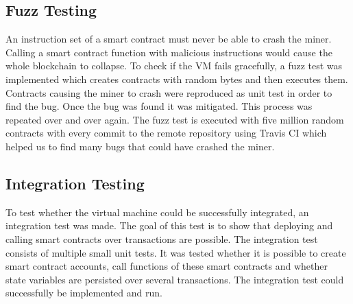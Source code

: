 \subsection{Fuzz Testing} \label{fuzz_testing}
An instruction set of a smart contract must never be able to crash the miner. Calling a smart contract function with malicious instructions would cause the whole blockchain to collapse. To check if the VM fails gracefully, a fuzz test was implemented which creates contracts with random bytes and then executes them. Contracts causing the miner to crash were reproduced as unit test in order to find the bug. Once the bug was found it was mitigated. This process was repeated over and over again. The fuzz test is executed with five million random contracts with every commit to the remote repository using Travis CI which helped us to find many bugs that could have crashed the miner.

\subsection{Integration Testing}
To test whether the virtual machine could be successfully integrated, an integration test was made. The goal of this test is to show that deploying and calling smart contracts over transactions are possible. The integration test consists of multiple small unit tests. It was tested whether it is possible to create smart contract accounts, call functions of these smart contracts and whether state variables are persisted over several transactions. The integration test could successfully be implemented and run.
